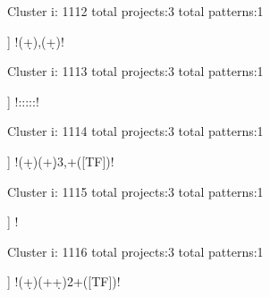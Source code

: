 Cluster i: 1112
total projects:3
total patterns:1
\begin{multicols}{1}
\begin{description}[noitemsep,topsep=0pt]
\item [[3] ] \cverb!\s*(\d+)\s*,\s*(\d+)\s*!
\end{description}
\end{multicols}







Cluster i: 1113
total projects:3
total patterns:1
\begin{multicols}{1}
\begin{description}[noitemsep,topsep=0pt]
\item [[3] ] \cverb!\w*:\w*:\w*:\w*:\w*:\w*!
\end{description}
\end{multicols}







Cluster i: 1114
total projects:3
total patterns:1
\begin{multicols}{1}
\begin{description}[noitemsep,topsep=0pt]
\item [[3] ] \cverb!(\d+)(\s+\d){3,}\s+([TF])!
\end{description}
\end{multicols}







Cluster i: 1115
total projects:3
total patterns:1
\begin{multicols}{1}
\begin{description}[noitemsep,topsep=0pt]
\item [[3] ] \cverb!%
\end{description}
\end{multicols}







Cluster i: 1116
total projects:3
total patterns:1
\begin{multicols}{1}
\begin{description}[noitemsep,topsep=0pt]
\item [[3] ] \cverb!(\d+)(\s+\d+){2}\s+([TF])!
\end{description}
\end{multicols}







